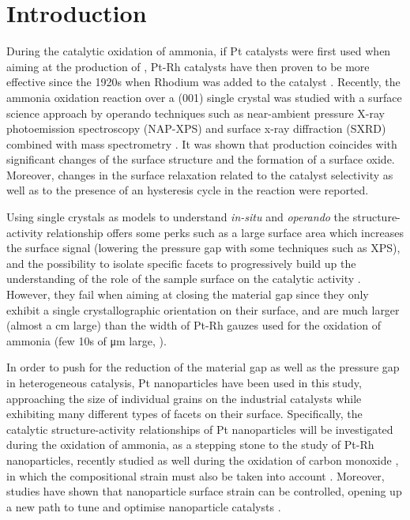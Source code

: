 \section{Introduction}

During the catalytic oxidation of ammonia, if Pt catalysts were first used when aiming at the production of , Pt-Rh catalysts have then proven to be more effective since the 1920s when Rhodium was added to the catalyst \parencite{Handforth1934, Heck1982}.
Recently, the ammonia oxidation reaction over a (001) single crystal was studied with a surface science approach by operando techniques such as near-ambient pressure X-ray photoemission spectroscopy (NAP-XPS) and surface x-ray diffraction (SXRD) combined with mass spectrometry \parencite{Resta2020a}.
It was shown that  production coincides with significant changes of the surface structure and the formation of a  surface oxide.
Moreover, changes in the surface relaxation related to the catalyst selectivity as well as to the presence of an hysteresis cycle in the reaction were reported.

Using single crystals as models to understand \textit{in-situ} and \textit{operando} the structure-activity relationship offers some perks such as a large surface area which increases the surface signal (lowering the pressure gap with some techniques such as XPS), and the possibility to isolate specific facets to progressively build up the understanding of the role of the sample surface on the catalytic activity \parencite{Hejral2016, Resta2020a}.
However, they fail when aiming at closing the material gap since they only exhibit a single crystallographic orientation on their surface, and are much larger (almost a \unit{cm} large) than the width of Pt-Rh gauzes used for the oxidation of ammonia (few 10s of \unit{\micro\meter} large, \cite{Kaiser1909}).

In order to push for the reduction of the material gap as well as the pressure gap in heterogeneous catalysis, Pt nanoparticles have been used in this study, approaching the size of individual grains on the industrial catalysts \cite{} while exhibiting many different types of facets on their surface.
Specifically, the catalytic structure-activity relationships of Pt nanoparticles will be investigated during the oxidation of ammonia, as a stepping stone to the study of Pt-Rh nanoparticles, recently studied as well during the oxidation of carbon monoxide \parencite{Kim2021}, in which the compositional strain must also be taken into account \parencite{Kawaguchi2019}.
Moreover, studies have shown that nanoparticle surface strain can be controlled, opening up a new path to tune and optimise nanoparticle catalysts \parencite{Zhang2014, Sneed2015, Wang2016}.

